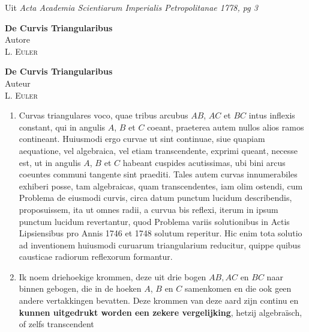 \documentclass[10pt,a4paper]{article}
\newcommand{\switchenum}{\setcounter{enumi}{\arabic{enumi}-1}\switchcolumn}
\begin{document}
	\par Uit \textit{Acta Academia Scientiarum Imperialis Petropolitanae 1778, pg 3} 

	\begin{paracol}{2}
	\begin{center}
		\par {}
		
		\par {\bf De Curvis Triangularibus}\\
		Autore\\
		\textsc{L. Euler}
	\end{center}
	\switchcolumn
		
	\begin{center}
		\par {}
		
		\par {\bf De Curvis Triangularibus}\\
		Auteur\\
		\textsc{L. Euler}
	\end{center}
	\switchcolumn*

	\par \begin{enumerate}[topsep=1px]
		\item Curvas triangulares voco, quae tribus arcubus $AB$, $AC$ et $BC$ intus inflexis constant, qui in angulis $A$, $B$ et $C$ coeant, praeterea autem nullos alios ramos contineant. Huiusmodi ergo curvae ut sint continuae, siue quapiam aequatione, vel algebraica, vel etiam transcendente, exprimi queant, necesse est, ut in angulis $A$, $B$ et $C$ habeant cuspides acutissimas, ubi bini arcus coeuntes communi tangente sint praediti. Tales autem curvas innumerabiles exhiberi posse, tam algebraicas, quam transcendentes, iam olim ostendi, cum Problema de eiusmodi curvis, circa datum punctum lucidum describendis, proposuissem, ita ut omnes radii, a curvua bis reflexi, iterum in ipsum punctum lucidum revertantur, quod Problema variis solutionibus in Actis Lipsiensibus pro Annis 1746 et 1748 solutum reperitur. Hic enim tota solutio ad inventionem huiusmodi curuarum triangularium reducitur, quippe quibus causticae radiorum reflexorum formantur.
		
		\switchenum
		\item Ik noem driehoekige krommen, deze uit drie bogen $AB, AC$ en $BC$ naar binnen gebogen, die in de hoeken $A$, $B$ en $C$ samenkomen en die ook geen andere vertakkingen bevatten. Deze krommen van deze aard zijn continu en \textbf{kunnen uitgedrukt worden een zekere vergelijking}, hetzij algebraïsch, of zelfs transcendent
		

\end{enumerate}
\end{paracol}
\end{document}
